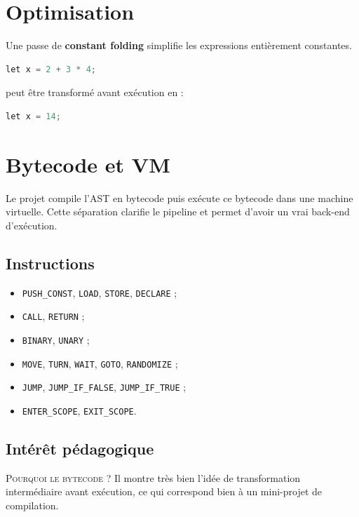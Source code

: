 \documentclass[12pt,a4paper]{article}
\newcommand{\smallcapslabel}[1]{\textcolor{accent}{\textsc{#1}}}
\begin{document}
\section{Optimisation}

Une passe de \textbf{constant folding} simplifie les expressions entièrement constantes.

\begin{lstlisting}[language=Python,caption={Constant folding}]
let x = 2 + 3 * 4;
\end{lstlisting}

peut être transformé avant exécution en :

\begin{lstlisting}[language=Python]
let x = 14;
\end{lstlisting}

\section{Bytecode et VM}

Le projet compile l'AST en bytecode puis exécute ce bytecode dans une machine virtuelle.
Cette séparation clarifie le pipeline et permet d'avoir un vrai back-end d'exécution.

\subsection{Instructions}

\begin{itemize}[nosep]
  \item \texttt{PUSH\_CONST}, \texttt{LOAD}, \texttt{STORE}, \texttt{DECLARE} ;
  \item \texttt{CALL}, \texttt{RETURN} ;
  \item \texttt{BINARY}, \texttt{UNARY} ;
  \item \texttt{MOVE}, \texttt{TURN}, \texttt{WAIT}, \texttt{GOTO}, \texttt{RANDOMIZE} ;
  \item \texttt{JUMP}, \texttt{JUMP\_IF\_FALSE}, \texttt{JUMP\_IF\_TRUE} ;
  \item \texttt{ENTER\_SCOPE}, \texttt{EXIT\_SCOPE}.
\end{itemize}

\subsection{Intérêt pédagogique}

\begin{darkbox}
\smallcapslabel{Pourquoi le bytecode ?} Il montre très bien l'idée de transformation
intermédiaire avant exécution, ce qui correspond bien à un mini-projet de compilation.
\end{darkbox}
\end{document}
